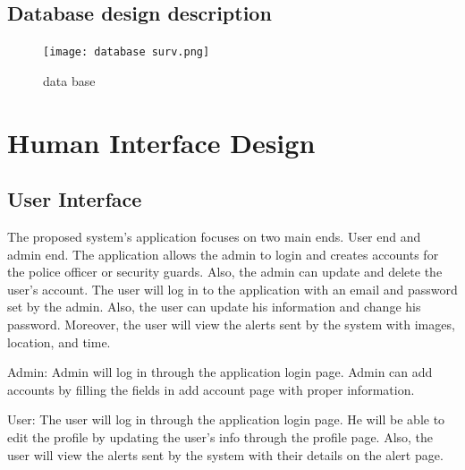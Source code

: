 \documentclass[12pt]{article}
\begin{document}
\subsection{Database design description}

\begin{figure}[h]
  \centering
  \texttt{[image: database surv.png]}
  \label{fig:2}
   \caption{data base}
\end{figure}
\FloatBarrier

\section{Human Interface Design}
\label{hid}
\subsection {User Interface}
The proposed system's application focuses on two main ends. User end and admin end. The application allows the admin to login and creates accounts for the police officer or security guards. Also, the admin can update and delete the user's account. The user will log in to the application with an email and password set by the admin. Also, the user can update his information and change his password. Moreover, the user will view the alerts sent by the system with images, location, and time.

Admin: Admin will log in through the application login page. Admin can add accounts by filling the fields in add account page with proper information.

User: The user will log in through the application login page. He will be able to edit the profile by updating the user's info through the profile page. Also, the user will view the alerts sent by the system with their details on the alert page.

\newpage
\end{document}
